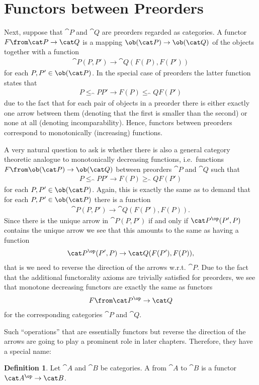 \documentclass{article}
\theoremstyle{definition}
\newtheorem{definition}{Definition}
\begin{document}
\section{Functors between Preorders}
Next, suppose that $\cat P$ and $\cat Q$ are preorders regarded as categories. A functor $F\from\cat P\to\cat Q$ is a mapping $\ob(\cat P)\to\ob(\cat Q)$ of the objects together with a function
\begin{align*}
  \cat P(P,P')\to\cat Q(F(P),F(P'))
\end{align*}
for each $P,P'\in\ob(\cat P)$. In the special case of preorders the latter function states that
\begin{align*}
  P\leq_\cat P P'\rightarrow F(P)\leq_\cat Q F(P')
\end{align*}
due to the fact that for each pair of objects in a preorder there is either exactly one arrow between them (denoting that the first is smaller than the second) or none at all (denoting incomparability). Hence, functors between preorders correspond to monotonically (increasing) functions.

A very natural question to ask is whether there is also a general category theoretic analogue to monotonically decreasing functions, i.e.\ functions $F\from\ob(\cat P)\to\ob(\cat Q)$ between preorders $\cat P$ and $\cat Q$ such that
\begin{align*}
  P\leq_\cat P P'\rightarrow F(P)\geq_\cat Q F(P')
\end{align*}
for each $P,P'\in\ob(\cat P)$. Again, this is exactly the same as to demand that for each $P,P'\in\ob(\cat P)$ there is a function
\begin{align*}
  \cat P(P,P')\to\cat Q(F(P'),F(P)).
\end{align*}
Since there is the unique arrow in $\cat P(P,P')$ if and only if $\cat P^\op(P',P)$ contains the unique arrow we see that this amounts to the same as having a function
\begin{align*}
  \cat P^\op(P',P)\to\cat Q(F(P'),F(P)),
\end{align*}
that is we need to reverse the direction of the arrows w.r.t. $\cat P$. Due to the fact that the additional functorality axioms are trivially satisfied for preorders, we see that monotone decreasing functors are exactly the same as functors
\begin{align*}
  F\from\cat P^\op\to\cat Q
\end{align*}
for the corresponding categories $\cat P$ and $\cat Q$.

Such ``operations'' that are essentially functors but reverse the direction of the arrows are going to play a prominent role in later chapters. Therefore, they have a special name:
\begin{definition}
  Let $\cat A$ and $\cat B$ be categories. A  from $\cat A$ to $\cat B$ is a functor $\cat A^\op\to\cat B$.
\end{definition}
\end{document}
